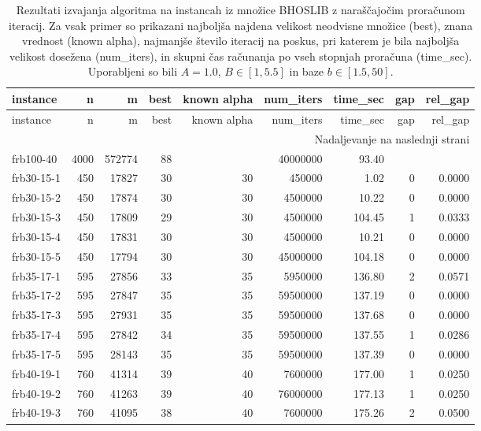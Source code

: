 {\setlength{\LTcapwidth}{\textwidth}
\begin{longtable}{lrrrrrrrr}
\caption{Rezultati izvajanja algoritma na instancah iz množice BHOSLIB z naraščajočim proračunom iteracij. Za vsak primer so prikazani najboljša najdena velikost neodvisne množice (best), znana vrednost (known alpha), najmanjše število iteracij na poskus, pri katerem je bila najboljša velikost dosežena (num\_iters), in skupni čas računanja po vseh stopnjah proračuna (time\_sec). Uporabljeni so bili $A = 1.0$, $B \in [1, 5.5]$ in baze $b \in [1.5, 50]$.} \label{tab:results_budget_tiers_bhoslib} \\
\toprule
instance & n & m & best & known alpha & num\_iters & time\_sec & gap & rel\_gap \\
\midrule
\endfirsthead
\toprule
instance & n & m & best & known alpha & num\_iters & time\_sec & gap & rel\_gap \\
\midrule
\endhead
\midrule
\multicolumn{9}{r}{Nadaljevanje na naslednji strani} \\
\endfoot
\bottomrule
\endlastfoot
frb100-40 & 4000 & 572774 & 88 &  & 40000000 & 93.40 &  &  \\
frb30-15-1 & 450 & 17827 & 30 & 30 & 450000 & 1.02 & 0 & 0.0000 \\
frb30-15-2 & 450 & 17874 & 30 & 30 & 4500000 & 10.22 & 0 & 0.0000 \\
frb30-15-3 & 450 & 17809 & 29 & 30 & 4500000 & 104.45 & 1 & 0.0333 \\
frb30-15-4 & 450 & 17831 & 30 & 30 & 4500000 & 10.21 & 0 & 0.0000 \\
frb30-15-5 & 450 & 17794 & 30 & 30 & 45000000 & 104.18 & 0 & 0.0000 \\
frb35-17-1 & 595 & 27856 & 33 & 35 & 5950000 & 136.80 & 2 & 0.0571 \\
frb35-17-2 & 595 & 27847 & 35 & 35 & 59500000 & 137.19 & 0 & 0.0000 \\
frb35-17-3 & 595 & 27931 & 35 & 35 & 59500000 & 137.68 & 0 & 0.0000 \\
frb35-17-4 & 595 & 27842 & 34 & 35 & 59500000 & 137.55 & 1 & 0.0286 \\
frb35-17-5 & 595 & 28143 & 35 & 35 & 59500000 & 137.39 & 0 & 0.0000 \\
frb40-19-1 & 760 & 41314 & 39 & 40 & 7600000 & 177.00 & 1 & 0.0250 \\
frb40-19-2 & 760 & 41263 & 39 & 40 & 76000000 & 177.13 & 1 & 0.0250 \\
frb40-19-3 & 760 & 41095 & 38 & 40 & 7600000 & 175.26 & 2 & 0.0500 \\

\end{longtable}}
